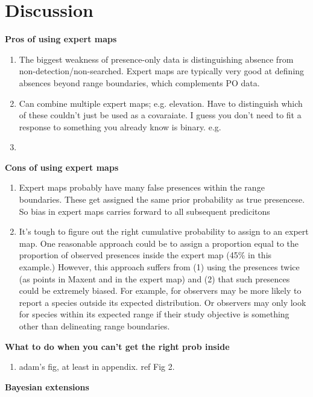 \section{Discussion}
\label{sec:disc} 

\textbf{Pros of using expert maps} 

\begin{enumerate}
  \item The biggest weakness of presence-only data is distinguishing absence from non-detection/non-searched. Expert maps are typically very good at defining absences beyond range boundaries, which complements PO data.
  \item Can combine multiple expert maps; e.g. elevation. Have to distinguish which of these couldn't just be used as a covaraiate. I guess you don't need to fit a response to something you already know is binary. e.g.
  \item 
\end{enumerate}


\textbf{Cons of using expert maps} 

\begin{enumerate}
  \item Expert maps probably have many false presences within the range boundaries. These get assigned the same prior probability as true presencese. So bias in expert maps carries forward to all subsequent predicitons
  \item It's tough to figure out the right cumulative probability to assign to an expert map. One reasonable approach could be to assign a proportion equal to the proportion of observed presences inside the expert map (45\% in this example.) However, this approach suffers from (1) using the presences twice (as points in Maxent and in the expert map) and (2) that such presences could be extremely biased. For example, for observers may be more likely to report a species outside its expected distribution. Or observers may only look for species within its expected range if their study objective is something other than delineating range boundaries. 
\end{enumerate}


\textbf{What to do when you can't get the right prob inside} 

\begin{enumerate}
  \item adam's fig, at least in appendix. ref Fig 2.
\end{enumerate}


\textbf{Bayesian extensions} 

